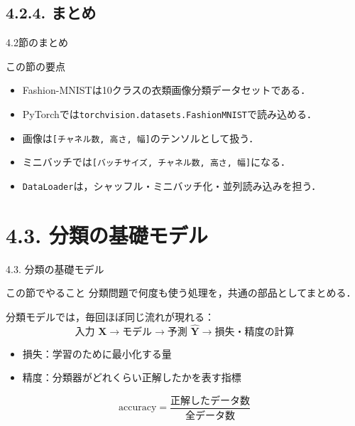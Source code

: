 \documentclass[dvipdfmx,uplatex,11pt]{beamer}
\newcommand{\shape}[1]{\texttt{#1}}
\begin{document}
\subsection{4.2.4. まとめ}
\begin{frame}{4.2節のまとめ}
\begin{d2lbox}{この節の要点}
\begin{itemize}
  \item Fashion-MNISTは10クラスの衣類画像分類データセットである．
  \item PyTorchでは\texttt{torchvision.datasets.FashionMNIST}で読み込める．
  \item 画像は\shape{[チャネル数, 高さ, 幅]}のテンソルとして扱う．
  \item ミニバッチでは\shape{[バッチサイズ, チャネル数, 高さ, 幅]}になる．
  \item \texttt{DataLoader}は，シャッフル・ミニバッチ化・並列読み込みを担う．
\end{itemize}
\end{d2lbox}
\end{frame}

\section{4.3. 分類の基礎モデル}

\begin{frame}{4.3. 分類の基礎モデル}
\begin{d2lbox}{この節でやること}
分類問題で何度も使う処理を，共通の部品としてまとめる．
\end{d2lbox}

\vspace{3mm}

分類モデルでは，毎回ほぼ同じ流れが現れる：
\[
\text{入力 } \bm X
\longrightarrow
\text{モデル}
\longrightarrow
\text{予測 } \hat{\bm Y}
\longrightarrow
\text{損失・精度の計算}
\]

\vspace{3mm}

\begin{itemize}
  \item \alert{損失}：学習のために最小化する量
  \item \alert{精度}：分類器がどれくらい正解したかを表す指標
\end{itemize}

\vspace{2mm}

\[
\mathrm{accuracy}
=
\frac{\text{正解したデータ数}}{\text{全データ数}}
\]
\end{frame}
\end{document}
